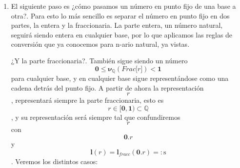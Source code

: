 \documentclass[
]{article}
\begin{document}
\begin{enumerate}
\begin{enumerate}
    \[{\mathit{r} = {{\mathit{{Ent}{\lbrack r\rbrack}} \cdot \mathbf{\mathrm{.}}} \cdot \mathit{{Frac}{\lbrack r\rbrack}}}} \in {{{{\mathbf{d}_{\mathbf{\mathrm{\iota \neq 0}}} \cdot \left\lbrack \mathbf{D}_{\mathbf{\mathrm{n}}} \right\rbrack^{\mathbf{\mathrm{\ast}}}} \cdot \mathbf{\mathrm{.}}} \cdot \left\lbrack \mathbf{D}_{\mathbf{\mathrm{n}}} \right\rbrack^{\mathbf{\mathrm{\ast}}}} \cdot \mathbf{d}_{\mathbf{\mathrm{\iota \neq 0}}}}\]
    y
    \[\mathbf{l}{{(\mathit{r})} = \mathbf{l}_{\mathbf{\mathrm{\mathit{frac}}}}}{{(\mathit{r})} + \mathbf{l}_{\mathbf{\mathrm{\mathit{ent}}}}}{(\mathit{r})}\].
    Para evaluar el valor de la representación la fórmula es la clásica
    \[\mathbf{\nu}_{\mathbb{Q}}{{(\mathit{r})} = {\sum\limits_{\mathbf{\mathrm{\iota}} = \mathbf{\mathrm{\mathit{l}{(\mathit{{{Ent}{\lbrack r\rbrack}} - 1})}}}}^{\mathbf{\mathrm{{- \mathit{l}}{(\mathit{{Frac}{\lbrack r\rbrack}})}}}}\left( {{\mathbf{\nu}{(\mathit{r}_{\mathbf{\mathrm{\iota}}})}} \cdot \mathbf{n}^{\mathbf{\mathrm{\iota}}}} \right)}}\].
    En general aunque ponemos explícita\-mente el punto, no es necesario
    una vez se conocen la longitudes de las partes entera y
    fraccionaria.
  \item
    El siguiente paso es ¿cómo pasamos un número en punto fijo de una
    base a otra?. Para esto lo más sencillo es separar el número en
    punto fijo en dos partes, la entera y la fraccionaria. La parte
    entera, un número natural, seguirá siendo entera en cualquier base,
    por lo que aplicamos las reglas de conversión que ya conocemos para
    n-ario na\-tural, ya vistas.

    ¿Y la parte fraccionaria?. También sigue siendo un número
    \[{\mathbf{0} \leq \mathbf{\nu}_{\mathbb{Q}}}{{({\mathit{Frac}{\lbrack r\rbrack}})} < \mathbf{1}}\]para
    cualquier base, y en cualquier base sigue representándose como una
    cadena de\-trás del punto fijo. A partir de ahora la representación
    \[\mathit{r}\], representará siempre la parte fraccionaria, esto es
    \[{\mathit{r} \in \lbrack}\mathbf{0},\mathbf{1}{) \subset \mathbb{Q}}\]
    , y su representación será siempre tal que confundiremos
    \[\mathit{r}\]con \[\mathbf{0}.\mathit{r}\]y
    \[\mathbf{l}{{(\mathit{r})} = \mathbf{l}_{\mathbf{\mathrm{\mathit{fracc}}}}}{{({\mathbf{0}.\mathit{r}})} = :}\mathbf{\mathrm{s}}\].
    Veremos los distintos ca\-sos:


\end{enumerate}
\end{enumerate}
\end{document}
